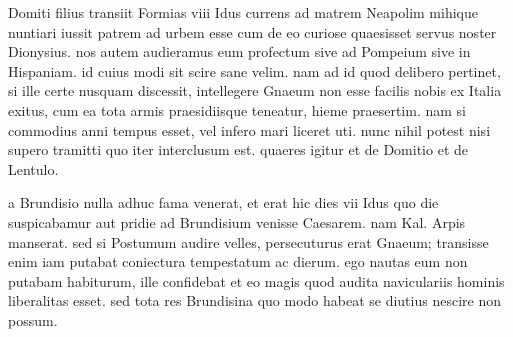 


 Domiti filius transiit Formias viii Idus currens ad matrem Neapolim mihique nuntiari iussit patrem ad urbem esse cum de eo curiose quaesisset servus noster Dionysius. nos autem audieramus eum profectum sive ad Pompeium sive in Hispaniam. id cuius modi sit scire sane velim. nam ad id quod delibero pertinet, si ille certe nusquam discessit, intellegere Gnaeum non esse facilis nobis ex Italia exitus, cum ea tota armis praesidiisque teneatur, hieme praesertim. nam si commodius anni tempus esset, vel infero mari liceret uti. nunc nihil potest nisi supero tramitti quo iter interclusum est. quaeres igitur et de Domitio et de Lentulo.

 a Brundisio nulla adhuc fama venerat, et erat hic dies vii Idus quo die suspicabamur aut pridie ad Brundisium venisse Caesarem. nam Kal. Arpis manserat. sed si Postumum audire velles, persecuturus erat Gnaeum; transisse enim iam putabat coniectura tempestatum ac dierum. ego nautas eum non putabam habiturum, ille confidebat et eo magis quod audita naviculariis hominis liberalitas esset. sed tota res Brundisina quo modo habeat se diutius nescire non possum.
